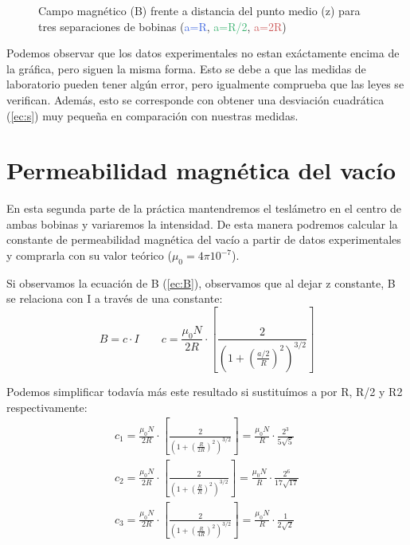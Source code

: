 \documentclass[12pt, a4paper, titlepage]{article}
\begin{document}
  \begin{figure}[H]
    \hspace{2.5em} 
    \caption{Campo magnético (B) frente a distancia del punto medio (z) para tres separaciones de bobinas (\textcolor{RoyalBlue}{a=R}, \textcolor{MediumSeaGreen}{a=R/2}, \textcolor{IndianRed}{a=2R})}
  \end{figure}

  Podemos observar que los datos experimentales no estan exáctamente encima de la gráfica, pero siguen la misma forma. Esto se debe a que las medidas de laboratorio pueden tener algún error, pero igualmente comprueba que las leyes se verifican. Además, esto se corresponde con obtener una desviación cuadrática (\ref{ec:s}) muy pequeña en comparación con nuestras medidas.


  \newpage
  \section{Permeabilidad magnética del vacío}

  En esta segunda parte de la práctica mantendremos el teslámetro en el centro de ambas bobinas y variaremos la intensidad. De esta manera podremos calcular la constante de permeabilidad magnética del vacío a partir de datos experimentales y comprarla con su valor teórico ($\mu_0 = 4 \pi 10^{-7}$).

  Si observamos la ecuación de B (\ref{ec:B}), observamos que al dejar z constante, B se relaciona con I a través de una constante:
  \begin{equation}
    B = c \cdot I \qquad c = \frac{\mu_0 N}{2R} \cdot \left[\frac{2}{\left(1 + \left(\frac{a/2}{R}\right)^2 \right)^{3/2}}\right] \nonumber
  \end{equation}

  Podemos simplificar todavía más este resultado si sustituímos a por R, R/2 y R2 respectivamente:
  \begin{gather}
    c_1 = \frac{\mu_0 N}{2R} \cdot \left[\frac{2}{\left(1 + \left(\frac{R}{2R}\right)^2 \right)^{3/2}}\right] = \frac{\mu_0 N}{R} \cdot \frac{2^3}{5\sqrt{5}} \nonumber \\
    c_2 = \frac{\mu_0 N}{2R} \cdot \left[\frac{2}{\left(1 + \left(\frac{R}{R}\right)^2 \right)^{3/2}}\right] = \frac{\mu_0 N}{R} \cdot \frac{2^6}{17\sqrt{17}} \nonumber \\
    c_3 = \frac{\mu_0 N}{2R} \cdot \left[\frac{2}{\left(1 + \left(\frac{R}{4R}\right)^2 \right)^{3/2}}\right] = \frac{\mu_0 N}{R} \cdot \frac{1}{2\sqrt{2}} \nonumber
  \end{gather}
\end{document}
